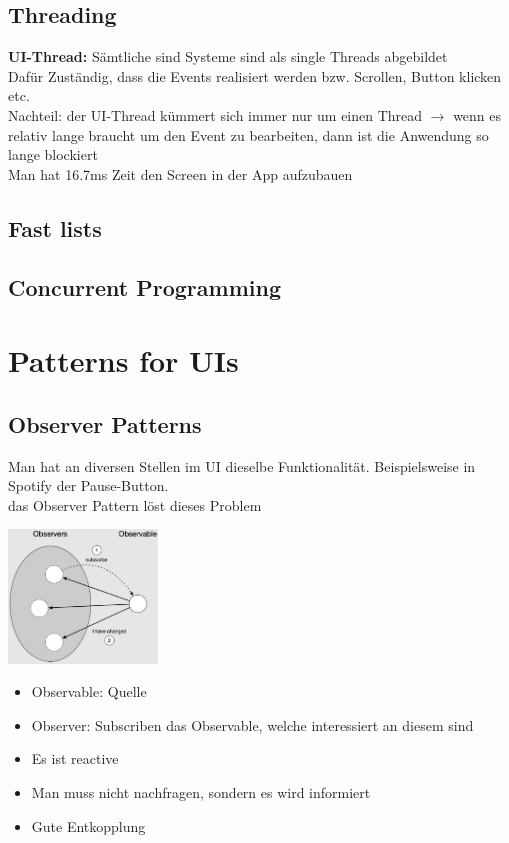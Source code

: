 \documentclass{report}
\newenvironment{Figure}
	{\par\medskip\noindent\minipage{\linewidth}}
	{\endminipage\par\medskip}
\theoremstyle{definition}
\theoremstyle{example}
\begin{document}
\section{Threading}
\textbf{UI-Thread:} Sämtliche sind Systeme sind als single Threads abgebildet\\
Dafür Zuständig, dass die Events realisiert werden bzw. Scrollen, Button klicken etc.\\

Nachteil: der UI-Thread kümmert sich immer nur um einen Thread $\rightarrow$ wenn es relativ lange braucht um den Event zu bearbeiten, dann ist die Anwendung so lange blockiert\\

Man hat 16.7ms Zeit den Screen in der App aufzubauen

\section{Fast lists}

\section{Concurrent Programming}


\chapter{Patterns for UIs}

\section{Observer Patterns}
Man hat an diversen Stellen im UI dieselbe Funktionalität. Beispielsweise in Spotify der Pause-Button.\\
das Observer Pattern löst dieses Problem

\begin{Figure}
   \centering
    \includegraphics[width=150px]{img/ObserverMechanics.png}
        \label{fig:Observer Mechanismus}
\end{Figure}
\begin{itemize}
   \item Observable: Quelle
   \item Observer: Subscriben das Observable, welche interessiert an diesem sind
   \item Es ist reactive
   \item Man muss nicht nachfragen, sondern es wird informiert
   \item Gute Entkopplung
\end{itemize}
\end{document}
